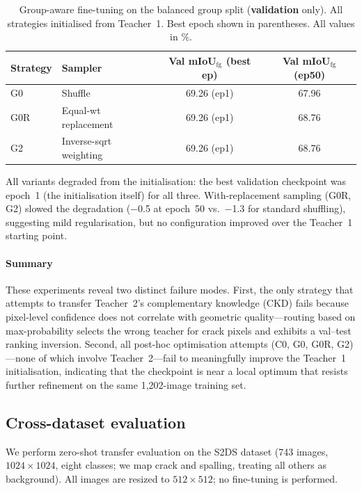 \documentclass[review,authoryear]{elsarticle}
\begin{document}
\begin{table}[t]
\centering
\caption{Group-aware fine-tuning on the balanced group split (\textbf{validation} only). All strategies initialised from Teacher~1. Best epoch shown in parentheses. All values in \%.}
\label{tab:rescue_group}
\begin{tabular}{llcc}
\toprule
Strategy & Sampler & Val mIoU$_{\text{fg}}$ (best ep) & Val mIoU$_{\text{fg}}$ (ep50) \\
\midrule
G0 & Shuffle & 69.26 (ep1) & 67.96 \\
G0R & Equal-wt replacement & 69.26 (ep1) & 68.76 \\
G2 & Inverse-sqrt weighting & 69.26 (ep1) & 68.76 \\
\bottomrule
\end{tabular}
\end{table}

All variants degraded from the initialisation: the best validation checkpoint was epoch~1 (the initialisation itself) for all three.
With-replacement sampling (G0R, G2) slowed the degradation ($-$0.5 at epoch~50 vs.\ $-$1.3 for standard shuffling), suggesting mild regularisation, but no configuration improved over the Teacher~1 starting point.

\paragraph{Summary}
These experiments reveal two distinct failure modes.
First, the only strategy that attempts to transfer Teacher~2's complementary knowledge (CKD) fails because pixel-level confidence does not correlate with geometric quality---routing based on max-probability selects the wrong teacher for crack pixels and exhibits a val--test ranking inversion.
Second, all post-hoc optimisation attempts (C0, G0, G0R, G2)---none of which involve Teacher~2---fail to meaningfully improve the Teacher~1 initialisation, indicating that the checkpoint is near a local optimum that resists further refinement on the same 1{,}202-image training set.

\subsection{Cross-dataset evaluation}
\label{sec:cross_dataset}

We perform zero-shot transfer evaluation on the S2DS dataset \citep{s2ds2021} (743 images, $1024{\times}1024$, eight classes; we map crack and spalling, treating all others as background).
All images are resized to $512{\times}512$; no fine-tuning is performed.
\end{document}
